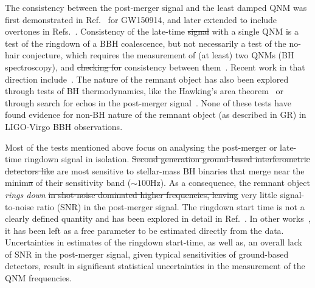 The consistency between the post-merger signal and the least damped QNM was first demonstrated in
Ref.~\citep{LSC_2016grtests} for GW150914, and later extended to include
overtones in Refs.~\citep{Brito:2018rfr,Giesler:2019uxc,Isi:2019aib,Bhagwat:2019dtm,Forteza:2020hbw}. Consistency
of the late-time \sout{signal}  with a single QNM is a test of the ringdown of
a BBH coalescence, but not necessarily a test of the no-hair
conjecture, which requires the measurement of (at least) two QNMs (BH
spectroscopy), and \sout{checking for} consistency between them~\cite{Dreyer:2003bv,Berti:2005ys}. Recent work
in that direction  include~\citep{Carullo:2018gah,Carullo:2019flw,Bhagwat:2019bwv}. The
nature of the remnant object has also been explored through tests of
BH thermodynamics, like the Hawking's area
theorem~\citep{Cabero:2017avf} or through search for echos in the
post-merger
signal~\citep{Nielsen:2018lkf,Tsang:2019zra,Lo:2018sep,Abedi:2018npz,Abedi:2020sgg,Testa:2018bzd}. None
of these tests have found evidence for non-BH nature of the remnant
object (as described in GR) in LIGO-Virgo BBH observations.

Most of the tests mentioned above focus on analysing the post-merger
or late-time ringdown signal in isolation. \sout{Second generation
ground-based interferometric detectors like}  are most sensitive to
stellar-mass BH binaries that merge near the
minim\sout{a} of their sensitivity band ($\sim 100$Hz). As a consequence, the
remnant object \textit{rings down}  \sout{in shot-noise dominated higher
frequencies, leaving} 
very little signal-to-noise ratio (SNR) in the
post-merger signal. 
The ringdown start time is not a clearly defined
quantity and has been explored in detail
in Ref.~\citep{Bhagwat:2017tkm}. In other
works~\citep{Carullo:2018gah,Carullo:2019flw}, it has been left as a
free parameter to be estimated directly from the data. Uncertainties
in estimates of the ringdown start-time, as well as, an overall lack of
SNR in the post-merger signal, given typical sensitivities of
ground-based detectors, result in significant statistical uncertainties
in the measurement of the QNM frequencies.

